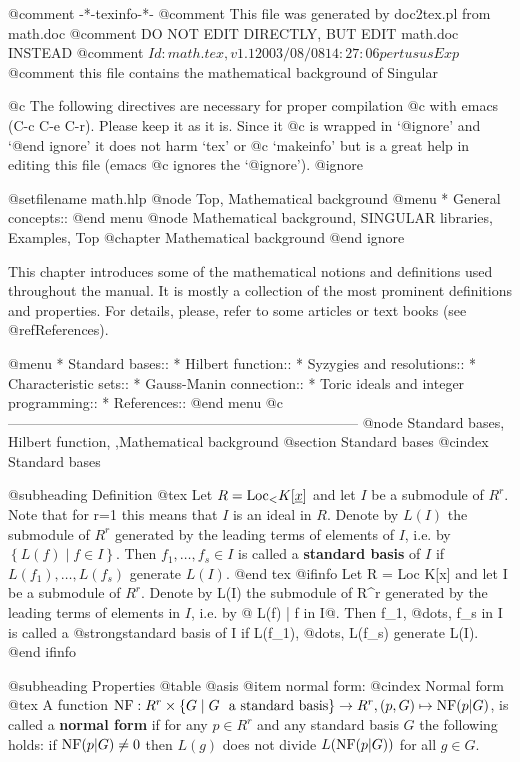 @comment -*-texinfo-*-
@comment This file was generated by doc2tex.pl from math.doc
@comment DO NOT EDIT DIRECTLY, BUT EDIT math.doc INSTEAD
@comment $Id: math.tex,v 1.1 2003/08/08 14:27:06 pertusus Exp $
@comment this file contains the mathematical background of Singular

@c The following directives are necessary for proper compilation
@c with emacs (C-c C-e C-r).  Please keep it as it is.  Since it
@c is wrapped in `@ignore' and `@end ignore' it does not harm `tex' or
@c `makeinfo' but is a great help in editing this file (emacs
@c ignores the `@ignore').
@ignore

@setfilename math.hlp
@node Top, Mathematical background
@menu
* General concepts::
@end menu
@node Mathematical background, SINGULAR libraries, Examples, Top
@chapter Mathematical background
@end ignore

This chapter introduces some of the mathematical notions and definitions used
throughout the manual. It is mostly a collection of the
most prominent definitions and properties. For details, please, refer to
some articles or text books (see @ref{References}).

@menu
* Standard bases::
* Hilbert function::
* Syzygies and resolutions::
* Characteristic sets::
* Gauss-Manin connection::
* Toric ideals and integer programming::
* References::
@end menu
@c ---------------------------------------------------------------------------
@node Standard bases, Hilbert function, ,Mathematical background
@section Standard bases
@cindex Standard bases

@subheading Definition
@tex
Let $R = \hbox{Loc}_< K[\underline{x}]$ and let $I$ be a submodule of $R^r$.
Note that for r=1 this means that $I$ is an ideal in $R$.
Denote by $L(I)$ the submodule of $R^r$ generated by the leading terms 
of elements of $I$, i.e. by $\left\{L(f) \mid f \in I\right\}$.
Then $f_1, \ldots, f_s \in I$ is called a {\bf standard basis} of $I$ 
if $L(f_1), \ldots, L(f_s)$ generate $L(I)$.
@end tex
@ifinfo
Let R = Loc K[x] and let I be a submodule of $R^r$.
Denote by L(I) the submodule of R^r generated by the leading terms 
of elements in $I$, i.e. by @{ L(f) | f in I@}.
Then f_1, @dots{}, f_s in I is called a @strong{standard basis} of I 
if L(f_1), @dots{}, L(f_s) generate L(I).
@end ifinfo

@subheading Properties
@table @asis
@item normal form:
@cindex Normal form
@tex
A function $\hbox{NF} : R^r \times \{G \mid G\ \hbox{ a standard
basis}\} \to R^r, (p,G) \mapsto \hbox{NF}(p|G)$, is called a {\bf normal
form} if for any $p \in R^r$ and any standard basis $G$ the following
holds: if $\hbox{NF}(p|G) \not= 0$ then $L(g)$ does not divide
$L(\hbox{NF}(p|G))$ for all $g \in G$.

